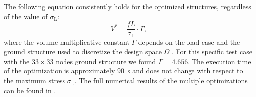 The following equation consistently holds for the optimized structures, regardless of the value of $\sigma_\text{L}$:
\begin{equation} \label{eq:03_V_star}
    V^*=\frac{fL}{\sigma_\text{L}}\cdot \Gamma,
\end{equation}
where the volume multiplicative constant $\Gamma$ depends on the load case and the ground structure used to discretize the design space $\Omega$ . For this specific test case with the $33 \times 33$ nodes ground structure we found $\Gamma=4.656$. The execution time of the optimization is approximately \qty{90}{\second} and does not change with respect to the maximum stress $\sigma_\text{L}$. The full numerical results of the multiple optimizations can be found in .

